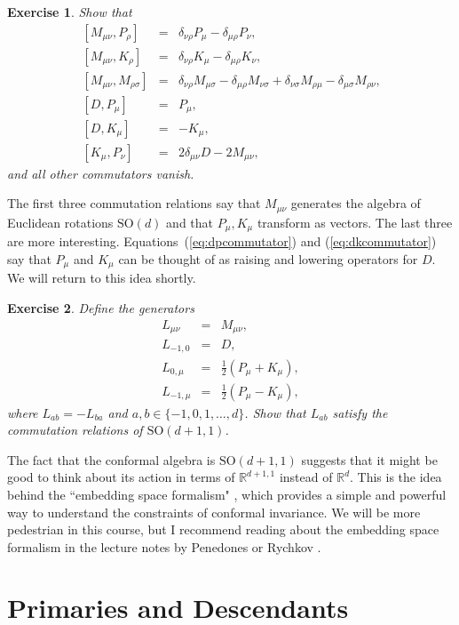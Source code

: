 \documentclass{ws-rv9x6}
\newcommand\be{\begin{eqnarray}}
\newcommand\ee{\end{eqnarray}}
\newcommand\<\langle
\renewcommand\>\rangle
\newcommand\de\delta
\newcommand\R{\mathbb{R}}
\newcommand\nn{\nonumber}
\renewcommand\.{\cdot}
\newcommand\s\sigma
\newcommand\SO{\mathrm{SO}}
\newtheorem{exercise}{Exercise}[section]
\begin{document}
\begin{exercise} Show that
\be
\,[M_{\mu\nu},P_\rho] &=& \de_{\nu\rho}P_\mu - \de_{\mu\rho}P_\nu,\\
\,[M_{\mu\nu},K_\rho] &=& \de_{\nu\rho}K_\mu - \de_{\mu\rho}K_\nu,\\
\,[M_{\mu\nu},M_{\rho\s}] &=& \de_{\nu\rho}M_{\mu\s}-\de_{\mu\rho}M_{\nu\s}+\de_{\nu\s}M_{\rho\mu}-\de_{\mu\s}M_{\rho\nu},\label{eq:mmcommutator}\\
\label{eq:dpcommutator}
\,[D,P_\mu]&=&P_\mu,\\
\label{eq:dkcommutator}
\,[D,K_\mu]&=&-K_\mu,\\
\,[K_\mu,P_\nu]&=&2\de_{\mu\nu}D-2M_{\mu\nu},
\ee
and all other commutators vanish.
\end{exercise}
The first three commutation relations say that $M_{\mu\nu}$ generates the algebra of Euclidean rotations $\SO(d)$ and that $P_\mu,K_\mu$ transform as vectors.  The last three are more interesting.  Equations~(\ref{eq:dpcommutator}) and (\ref{eq:dkcommutator}) say that $P_\mu$ and $K_\mu$ can be thought of as raising and lowering operators for $D$. We will return to this idea shortly.

\begin{exercise} Define the generators
\be
\label{eq:conformalgeneratorssodplus11}
L_{\mu\nu}&=&M_{\mu\nu},\nn\\
L_{-1,0} &=& D,\nn\\
L_{0,\mu} &=& \frac 1 2 (P_\mu+K_\mu),\nn\\
L_{-1,\mu}&=& \frac 1 2 (P_\mu-K_\mu),
\ee
where $L_{ab}=-L_{ba}$ and $a,b\in \{-1,0,1,\dots,d\}$.  Show that $L_{ab}$ satisfy the commutation relations of $\SO(d+1,1)$.
\end{exercise}
The fact that the conformal algebra is $\SO(d+1,1)$ suggests that it might be good to think about its action in terms of $\R^{d+1,1}$ instead of $\R^d$.  This is the idea behind the ``embedding space formalism" \cite{Dirac:1936fq,Mack:1969rr,Boulware:1970ty,Ferrara:1973eg,Weinberg:2010fx,Costa:2011mg}, which provides a simple and powerful way to understand the constraints of conformal invariance. We will be more pedestrian in this course, but I recommend reading about the embedding space formalism in the lecture notes by Penedones \cite{Joao} or Rychkov \cite{Rychkov:2016iqz}.

\section{Primaries and Descendants}
\end{document}
